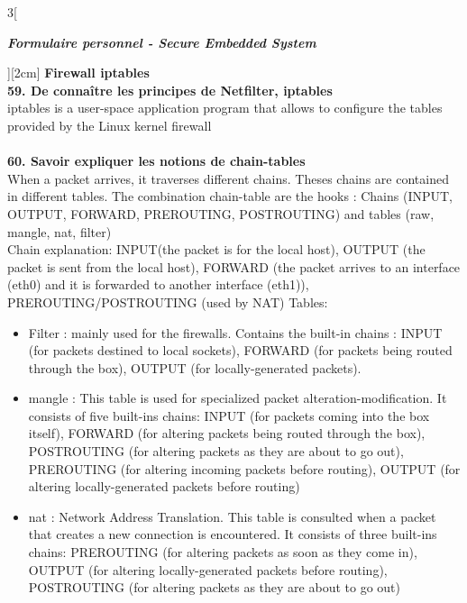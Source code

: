 \begin{multicols}{3}[\centerline{ \large\em \textbf{Formulaire personnel - Secure Embedded System}}][2cm]
{\Large \textbf{Firewall iptables}}\\
\textbf{59. De connaître les principes de Netfilter, iptables\\}
iptables is a user-space application program that allows to configure the
tables provided by the Linux kernel firewall \\
\\ \textbf{60. Savoir expliquer les notions de chain-tables\\}
When a packet arrives, it traverses different chains. Theses chains are contained in different tables. The combination chain-table are the hooks : Chains (INPUT, OUTPUT, FORWARD, PREROUTING, POSTROUTING) and tables (raw, mangle, nat, filter)\\
Chain explanation: INPUT(the packet is for the local host), OUTPUT (the packet is sent from the local host), FORWARD (the packet arrives to an interface (eth0) and it is forwarded to another interface (eth1)), PREROUTING/POSTROUTING (used by NAT)
Tables:
\begin{itemize}
\item Filter : mainly used for the firewalls. Contains the built-in chains : INPUT (for packets destined to local sockets), FORWARD (for packets being routed through the box), OUTPUT (for locally-generated packets).
\item mangle : This table is used for specialized packet alteration-modification. It consists of five built-ins chains: INPUT (for packets coming into the box itself), FORWARD (for altering packets being routed through
the box), POSTROUTING (for altering packets as they are about
to go out), PREROUTING (for altering incoming packets before
routing), OUTPUT (for altering locally-generated packets before
routing)
\item nat : Network Address Translation. This table is consulted when a packet that creates a new connection is encountered. It consists of three built-ins chains: PREROUTING (for altering packets as soon as they come in), OUTPUT (for altering locally-generated packets before routing), POSTROUTING (for altering packets as they are about to go out)
\end{itemize}
\begin{minipage}{\linewidth}
	\centering

\end{minipage}
\end{multicols}

